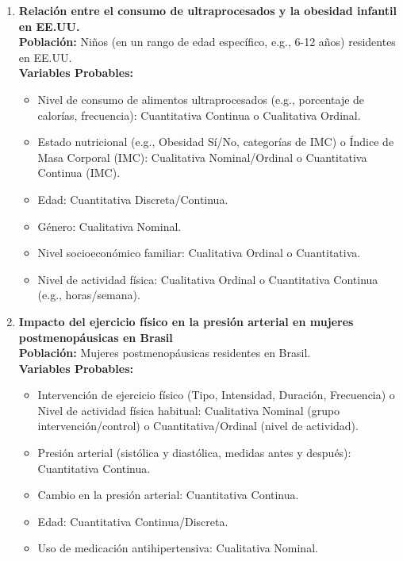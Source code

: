 \documentclass[12pt, letterpaper]{article}
\begin{document}
\begin{enumerate}
\item \textbf{Relación entre el consumo de ultraprocesados y la obesidad infantil en EE.UU.} \\
\textbf{Población:} Niños (en un rango de edad específico, e.g., 6-12 años) residentes en EE.UU. \\
\textbf{Variables Probables:}
\begin{itemize}
  \item Nivel de consumo de alimentos ultraprocesados (e.g., porcentaje de calorías, frecuencia): Cuantitativa Continua o Cualitativa Ordinal.
  \item Estado nutricional (e.g., Obesidad Sí/No, categorías de IMC) o Índice de Masa Corporal (IMC): Cualitativa Nominal/Ordinal o Cuantitativa Continua (IMC).
  \item Edad: Cuantitativa Discreta/Continua.
  \item Género: Cualitativa Nominal.
  \item Nivel socioeconómico familiar: Cualitativa Ordinal o Cuantitativa.
  \item Nivel de actividad física: Cualitativa Ordinal o Cuantitativa Continua (e.g., horas/semana).
\end{itemize}

\item \textbf{Impacto del ejercicio físico en la presión arterial en mujeres postmenopáusicas en Brasil} \\
\textbf{Población:} Mujeres postmenopáusicas residentes en Brasil. \\
\textbf{Variables Probables:}
\begin{itemize}
  \item Intervención de ejercicio físico (Tipo, Intensidad, Duración, Frecuencia) o Nivel de actividad física habitual: Cualitativa Nominal (grupo intervención/control) o Cuantitativa/Ordinal (nivel de actividad).
  \item Presión arterial (sistólica y diastólica, medidas antes y después): Cuantitativa Continua.
  \item Cambio en la presión arterial: Cuantitativa Continua.
  \item Edad: Cuantitativa Continua/Discreta.
  \item Uso de medicación antihipertensiva: Cualitativa Nominal.
\end{itemize}


\end{enumerate}
\end{document}
